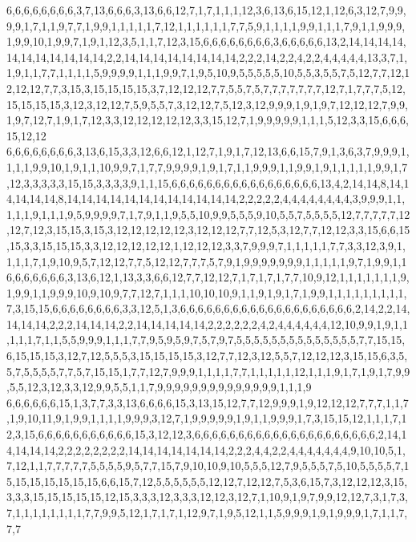 6,6,6,6,6,6,6,6,3,7,13,6,6,6,3,13,6,6,12,7,1,7,1,1,1,12,3,6,13,6,15,12,1,12,6,3,12,7,9,9,9,9,1,7,1,1,9,7,7,1,9,9,1,1,1,1,1,7,12,1,1,1,1,1,1,7,7,5,9,1,1,1,1,9,9,1,1,1,7,9,1,1,9,9,9,1,9,9,10,1,9,9,7,1,9,1,12,3,5,1,1,7,12,3,15,6,6,6,6,6,6,6,6,3,6,6,6,6,6,13,2,14,14,14,14,14,14,14,14,14,14,14,2,2,14,14,14,14,14,14,14,14,2,2,2,14,2,2,4,2,2,4,4,4,4,4,13,3,7,1,1,9,1,1,7,7,1,1,1,1,5,9,9,9,9,1,1,1,9,9,7,1,9,5,10,9,5,5,5,5,5,10,5,5,3,5,5,7,5,12,7,7,12,12,12,12,7,7,3,15,3,15,15,15,15,3,7,12,12,12,7,7,5,5,7,5,7,7,7,7,7,7,7,12,7,1,7,7,7,5,12,15,15,15,15,3,12,3,12,12,7,5,9,5,5,7,3,12,12,7,5,12,3,12,9,9,9,1,9,1,9,7,12,12,12,7,9,9,1,9,7,12,7,1,9,1,7,12,3,3,12,12,12,12,12,3,3,15,12,7,1,9,9,9,9,9,1,1,1,5,12,3,3,15,6,6,6,15,12,12
6,6,6,6,6,6,6,6,3,13,6,15,3,3,12,6,6,12,1,12,7,1,9,1,7,12,13,6,6,15,7,9,1,3,6,3,7,9,9,9,1,1,1,1,9,9,10,1,9,1,1,10,9,9,7,1,7,7,9,9,9,9,1,9,1,7,1,1,9,9,9,1,1,9,9,1,9,1,1,1,1,1,9,9,1,7,12,3,3,3,3,3,15,15,3,3,3,3,9,1,1,15,6,6,6,6,6,6,6,6,6,6,6,6,6,6,6,6,6,13,4,2,14,14,8,14,14,14,14,14,8,14,14,14,14,14,14,14,14,14,14,14,14,2,2,2,2,2,4,4,4,4,4,4,4,4,3,9,9,9,1,1,1,1,1,9,1,1,1,9,5,9,9,9,9,7,1,7,9,1,1,9,5,5,10,9,9,5,5,5,9,10,5,5,7,5,5,5,5,12,7,7,7,7,7,12,12,7,12,3,15,15,3,15,3,12,12,12,12,12,3,12,12,12,7,7,12,5,3,12,7,7,12,12,3,3,15,6,6,15,15,3,3,15,15,15,3,3,12,12,12,12,12,1,12,12,12,3,3,7,9,9,9,7,1,1,1,1,1,7,7,3,3,12,3,9,1,1,1,1,7,1,9,10,9,5,7,12,12,7,7,5,12,12,7,7,7,5,7,9,1,9,9,9,9,9,9,9,1,1,1,1,1,9,7,1,9,9,1,1
6,6,6,6,6,6,6,3,13,6,12,1,13,3,3,6,6,12,7,7,12,12,7,1,7,1,7,1,7,7,10,9,12,1,1,1,1,1,1,1,9,1,9,9,1,1,9,9,9,10,9,10,9,7,7,12,7,1,1,1,10,10,10,9,1,1,9,1,9,1,7,1,9,9,1,1,1,1,1,1,1,1,1,7,3,15,15,6,6,6,6,6,6,6,6,3,3,12,5,1,3,6,6,6,6,6,6,6,6,6,6,6,6,6,6,6,6,6,6,6,6,2,14,2,2,14,14,14,14,2,2,2,14,14,14,2,2,14,14,14,14,14,2,2,2,2,2,2,4,2,4,4,4,4,4,4,12,10,9,9,1,9,1,1,1,1,1,7,1,1,5,5,9,9,9,1,1,1,7,7,9,5,9,5,9,7,5,7,9,7,5,5,5,5,5,5,5,5,5,5,5,5,5,5,7,7,15,15,6,15,15,15,3,12,7,12,5,5,5,3,15,15,15,15,3,12,7,7,12,3,12,5,5,7,12,12,12,3,15,15,6,3,5,5,7,5,5,5,5,7,7,5,7,15,15,1,7,7,12,7,9,9,9,1,1,1,1,7,7,1,1,1,1,1,12,1,1,1,9,1,7,1,9,1,7,9,9,5,5,12,3,12,3,3,12,9,9,5,5,1,1,7,9,9,9,9,9,9,9,9,9,9,9,9,9,9,1,1,1,9
6,6,6,6,6,6,15,1,3,7,7,3,3,13,6,6,6,6,15,3,13,15,12,7,7,12,9,9,9,1,9,12,12,12,7,7,7,1,1,7,1,9,10,11,9,1,9,9,1,1,1,1,9,9,9,3,12,7,1,9,9,9,9,9,1,9,1,1,9,9,9,1,7,3,15,15,12,1,1,1,7,12,3,15,6,6,6,6,6,6,6,6,6,6,6,15,3,12,12,3,6,6,6,6,6,6,6,6,6,6,6,6,6,6,6,6,6,6,6,6,6,2,14,14,14,14,14,2,2,2,2,2,2,2,2,14,14,14,14,14,14,14,2,2,2,4,4,2,2,4,4,4,4,4,4,4,9,10,10,5,1,7,12,1,1,7,7,7,7,7,5,5,5,5,9,5,7,7,15,7,9,10,10,9,10,5,5,5,12,7,9,5,5,5,7,5,10,5,5,5,5,7,15,15,15,15,15,15,15,6,6,15,7,12,5,5,5,5,5,5,12,12,7,12,12,7,5,3,6,15,7,3,12,12,12,3,15,3,3,3,15,15,15,15,15,12,15,3,3,3,12,3,3,3,12,12,3,12,7,1,10,9,1,9,7,9,9,12,12,7,3,1,7,3,7,1,1,1,1,1,1,1,1,7,7,9,9,5,12,1,7,1,7,1,12,9,7,1,9,5,12,1,1,5,9,9,9,1,9,1,9,9,9,1,7,1,1,7,7,7
